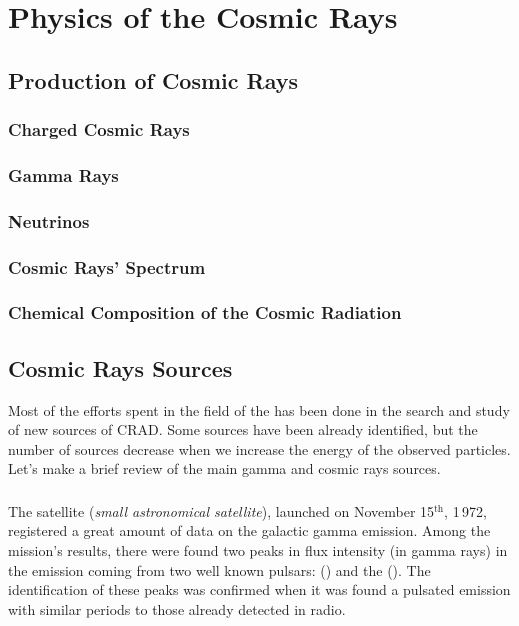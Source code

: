 \section{Physics of the Cosmic Rays}

\subsection{Production of Cosmic Rays}

\subsubsection{Charged Cosmic Rays}

\subsubsection{Gamma Rays}

\subsubsection{Neutrinos}

\subsubsection{Cosmic Rays' Spectrum}

\subsubsection{Chemical Composition of the Cosmic Radiation}

\subsection{Cosmic Rays Sources}

Most of the efforts spent in the field of the \emph{} has been done in the search and study of new sources of
CRAD. Some sources have been already identified, but the number of
sources decrease when we increase the energy of the observed
particles. Let's make a brief review of the main gamma and cosmic rays
sources.

\subsubsection{}

The satellite  (\emph{small astronomical satellite}),
launched on November 15$^{\mathrm{th}}$, 1\,972, registered a great
amount of data on the galactic gamma emission. Among the mission's
results, there were found two peaks in flux intensity (in gamma rays)
in the emission coming from two well known pulsars: 
() and the  (). The
identification of these peaks was confirmed when it was found a
pulsated emission with similar periods to those already detected in
radio.

